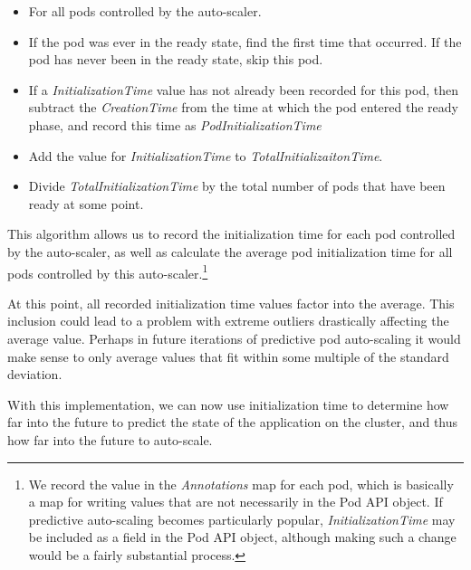 \begin{itemize}
  \item For all pods controlled by the auto-scaler.
  \item If the pod was ever in the ready state, find the first time that
    occurred. If the pod has never been in the ready state, skip this pod.
  \item If a \textit{InitializationTime} value has not already been recorded for
    this pod, then subtract the \textit{CreationTime} from the time at which the
    pod entered the ready phase, and record this time as
    \textit{PodInitializationTime}
  \item Add the value for \textit{InitializationTime} to
    \textit{TotalInitializaitonTime}.
  \item Divide \textit{TotalInitializationTime} by the total number of pods that
    have been ready at some point.
\end{itemize}

This algorithm allows us to record the initialization time for each pod
controlled by the auto-scaler, as well as calculate the average pod
initialization time for all pods controlled by this auto-scaler.\footnote{We
record the value in the \textit{Annotations} map for each pod,
which is basically a map for writing
values that are not necessarily in the Pod API object. If predictive
auto-scaling becomes particularly popular, \textit{InitializationTime} may be
included as a field in the Pod API object, although making such a change would
be a fairly substantial process.}

At this point, all recorded initialization time values factor into the average.
This inclusion could lead to a problem with extreme outliers drastically
affecting the average value. Perhaps in future iterations of predictive pod
auto-scaling it would make sense to only average values that fit within some
multiple of the standard deviation.

With this implementation, we can now use initialization time to determine how
far into the future to predict the state of the application on the cluster, and
thus how far into the future to auto-scale.
